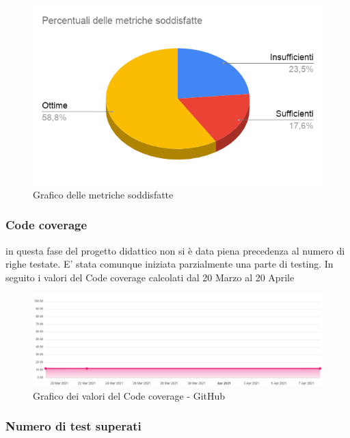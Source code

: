         \begin{figure}[H]
            \centering
            \includegraphics[width=14 cm]{source/sections/images/percentuale-metriche-soddisfatte.png}
            \caption{Grafico delle metriche soddisfatte}
        \end{figure}

\subsubsection{Code coverage}
    in questa fase del progetto didattico non si è data piena precedenza al numero di righe testate. E' stata comunque
    iniziata parzialmente una parte di testing. In seguito i valori del Code coverage calcolati dal 20 Marzo al 20 Aprile
    \begin{figure}[H]
        \centering
        \includegraphics[width=16 cm]{source/sections/images/CodeCoverage.png}
        \caption{Grafico dei valori del Code coverage - GitHub}
    \end{figure}


\subsubsection{Numero di test superati}

